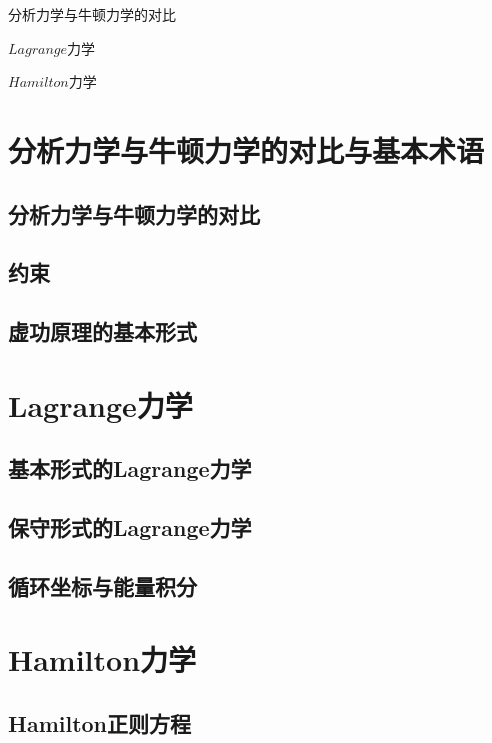 \begin{introduction}
    \item 分析力学与牛顿力学的对比
    \item $Lagrange$力学
    \item $Hamilton$力学
\end{introduction}

\section{分析力学与牛顿力学的对比与基本术语}
    \subsection{分析力学与牛顿力学的对比}
    
    \subsection{约束}
    
    \subsection{虚功原理的基本形式}

\section{Lagrange力学}
    \subsection{基本形式的Lagrange力学}
    
    \subsection{保守形式的Lagrange力学}
    
    \subsection{循环坐标与能量积分}
    
\section{Hamilton力学}

    \subsection{Hamilton正则方程}
    
